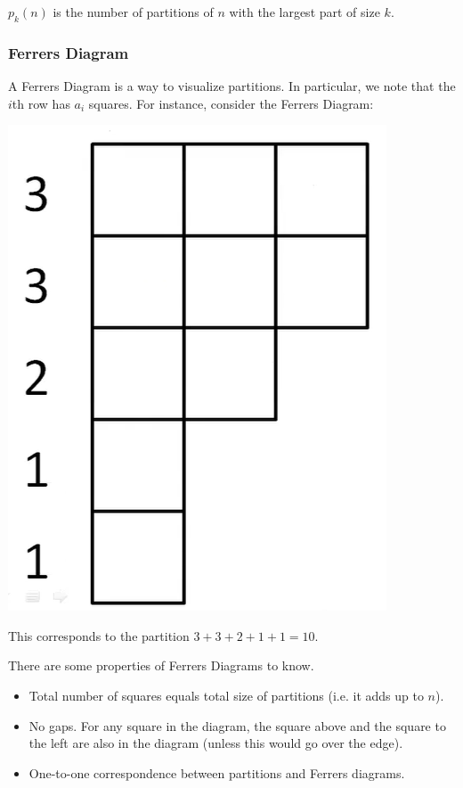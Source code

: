 \documentclass[letterpaper]{article}
\begin{document}
\begin{theorem}{}{}
    $p_{k}(n)$ is the number of partitions of $n$ with the largest part of size $k$.
\end{theorem}

\subsubsection{Ferrers Diagram}
A Ferrers Diagram is a way to visualize partitions. In particular, we note that the $i$th row has $a_i$ squares. For instance, consider the Ferrers Diagram:
\begin{center}
    \includegraphics[scale=0.3]{ferrer.PNG}
\end{center}
This corresponds to the partition $3 + 3 + 2 + 1 + 1 = 10$. 

\bigskip 

There are some properties of Ferrers Diagrams to know.
\begin{itemize}
    \item Total number of squares equals total size of partitions (i.e. it adds up to $n$).
    \item No gaps. For any square in the diagram, the square above and the square to the left are also in the diagram (unless this would go over the edge). 
    \item One-to-one correspondence between partitions and Ferrers diagrams. 
\end{itemize}
\end{document}
